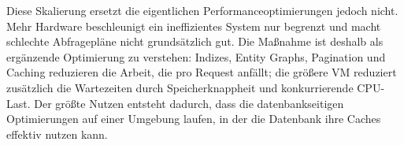 Diese Skalierung ersetzt die eigentlichen Performanceoptimierungen jedoch nicht. Mehr Hardware beschleunigt ein ineffizientes System nur begrenzt und macht schlechte Abfragepläne nicht grundsätzlich gut. Die Maßnahme ist deshalb als ergänzende Optimierung zu verstehen: Indizes, Entity Graphs, Pagination und Caching reduzieren die Arbeit, die pro Request anfällt; die größere VM reduziert zusätzlich die Wartezeiten durch Speicherknappheit und konkurrierende CPU-Last. Der größte Nutzen entsteht dadurch, dass die datenbankseitigen Optimierungen auf einer Umgebung laufen, in der die Datenbank ihre Caches effektiv nutzen kann.
